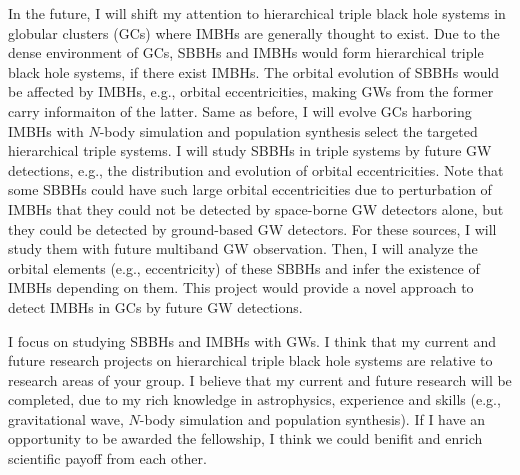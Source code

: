 \documentclass[12pt,a4paper,sans]{article}%
\begin{document}
In the future, I will shift my attention to hierarchical triple black hole systems in globular clusters (GCs) where
IMBHs are generally thought to exist. Due to the dense environment of GCs, SBBHs and IMBHs would form hierarchical
triple black hole systems, if there exist IMBHs. The orbital evolution of SBBHs would be affected by IMBHs, e.g.,
orbital eccentricities, making GWs
from the former carry informaiton of the latter. Same as before, I will evolve GCs harboring IMBHs with $N$-body
simulation and population synthesis
select the targeted hierarchical triple systems. I will study SBBHs in triple systems by future GW detections,
e.g., the distribution and evolution of orbital
eccentricities. Note that some SBBHs could have such large orbital eccentricities due to perturbation of IMBHs that they
could not be
detected by space-borne GW detectors alone, but they could be detected by ground-based GW detectors. For these sources,
I will study them with future multiband GW observation. Then, I will analyze the orbital elements (e.g., eccentricity) of
these SBBHs and infer the existence of IMBHs depending on them. This project would provide a novel approach to detect IMBHs in GCs by future GW detections.  

I focus on studying SBBHs and IMBHs with GWs. I think that my current and future research projects on
hierarchical triple
black hole systems are relative to research areas of your group. I believe that my current and future research will be completed, due to my rich knowledge in astrophysics,
experience and skills (e.g., gravitational wave, $N$-body
simulation and population synthesis). If I have an opportunity to be awarded the fellowship, I think we could benifit and enrich scientific payoff from each other. 




%
\end{document}
